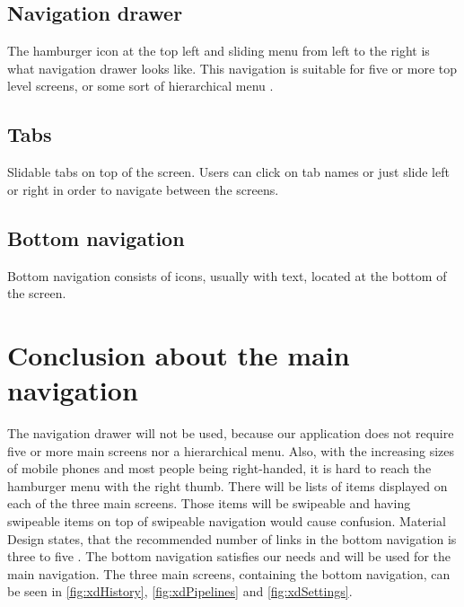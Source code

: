 \subsection{Navigation drawer}
The hamburger icon at the top left and sliding menu from left to the right is what navigation drawer looks like.
This navigation is suitable for five or more top level screens, or some sort of hierarchical menu \cite{navigationdrawer}.

\subsection{Tabs}
Slidable tabs on top of the screen.
Users can click on tab names or just slide left or right in order to navigate between the screens.

\subsection{Bottom navigation}
Bottom navigation consists of icons, usually with text, located at the bottom of the screen.

\section{Conclusion about the main navigation}
The navigation drawer will not be used, because our application does not require five or more main screens nor a hierarchical menu.
Also, with the increasing sizes of mobile phones and most people being right-handed, it is hard to reach the hamburger menu with the right thumb.
There will be lists of items displayed on each of the three main screens.
Those items will be swipeable and having swipeable items on top of swipeable navigation would cause confusion.
Material Design states, that the recommended number of links in the bottom navigation is three to five \cite{bottomnavigation}.
The bottom navigation satisfies our needs and will be used for the main navigation.
The three main screens, containing the bottom navigation, can be seen in \autoref{fig:xdHistory}, \autoref{fig:xdPipelines} and \autoref{fig:xdSettings}.

